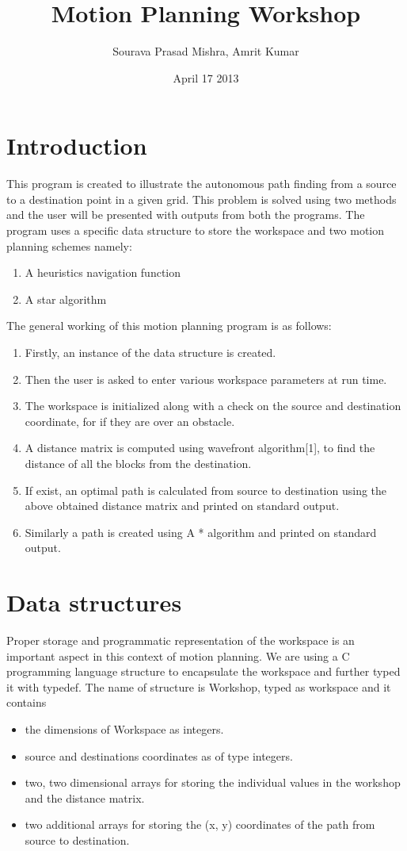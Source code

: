 \documentclass{report}
\title{Motion Planning Workshop}
\author{Sourava Prasad Mishra, Amrit Kumar}
\date{April 17 2013}
\begin{document}
\maketitle

\section{Introduction}

	This program is created to illustrate the autonomous path finding from a source to a destination point in a given grid. This problem is solved using two methods and the user will be presented with outputs from both the programs. The program uses a specific data structure to store the workspace and two motion planning schemes namely:
	\begin{enumerate}
	\item A heuristics navigation function
	\item A star algorithm
	\end{enumerate}

	The general working of this motion planning program is as follows:
	\begin{enumerate}
	\item Firstly, an instance of the data structure is created.
	\item Then the user is asked to enter various workspace parameters at run time.
	\item The workspace is initialized along with a check on the source and destination coordinate, for if they are over an obstacle.
	\item A distance matrix is computed using \textsf{wavefront algorithm}[1], to find the distance of all the blocks from the destination.
	\item If exist, an optimal path is calculated from source to destination using the above obtained distance matrix and printed on standard output.
	\item Similarly a path is created using A * algorithm and printed on standard output.
	\end{enumerate}

\section{Data structures}
	Proper storage and programmatic representation of the workspace is an important aspect in this context of motion planning. We are using a \textsf{C} programming language \textsf{structure} to encapsulate the workspace and further typed it with \textsf{typedef}. The name of structure is \textsf{Workshop}, typed as \textsf{workspace} and it contains	
	\begin{itemize}
	\item the dimensions of Workspace as \textsf{integers}.
	\item source and destinations coordinates as of type \textsf{integers}.
	\item two, two dimensional \textsf{arrays} for storing the individual values in the workshop and the distance matrix.
	\item two additional \textsf{arrays} for storing the (x, y) coordinates of the path from source to destination.
	\end{itemize}
	
\end{document}
